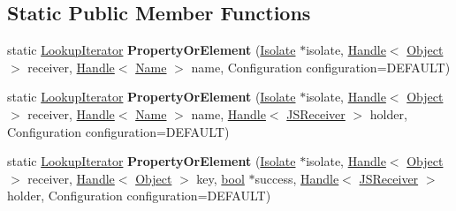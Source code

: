 \subsection*{Static Public Member Functions}
\begin{DoxyCompactItemize}
\item 
\mbox{\label{classv8_1_1internal_1_1LookupIterator_ada5b1e2e249036efcc799f937738c6c8}} 
static \mbox{\hyperlink{classv8_1_1internal_1_1LookupIterator}{Lookup\+Iterator}} {\bfseries Property\+Or\+Element} (\mbox{\hyperlink{classv8_1_1internal_1_1Isolate}{Isolate}} $\ast$isolate, \mbox{\hyperlink{classv8_1_1internal_1_1Handle}{Handle}}$<$ \mbox{\hyperlink{classv8_1_1internal_1_1Object}{Object}} $>$ receiver, \mbox{\hyperlink{classv8_1_1internal_1_1Handle}{Handle}}$<$ \mbox{\hyperlink{classv8_1_1internal_1_1Name}{Name}} $>$ name, Configuration configuration=D\+E\+F\+A\+U\+LT)
\item 
\mbox{\label{classv8_1_1internal_1_1LookupIterator_a0f4df452bbef58f2e4e00c300d6e0010}} 
static \mbox{\hyperlink{classv8_1_1internal_1_1LookupIterator}{Lookup\+Iterator}} {\bfseries Property\+Or\+Element} (\mbox{\hyperlink{classv8_1_1internal_1_1Isolate}{Isolate}} $\ast$isolate, \mbox{\hyperlink{classv8_1_1internal_1_1Handle}{Handle}}$<$ \mbox{\hyperlink{classv8_1_1internal_1_1Object}{Object}} $>$ receiver, \mbox{\hyperlink{classv8_1_1internal_1_1Handle}{Handle}}$<$ \mbox{\hyperlink{classv8_1_1internal_1_1Name}{Name}} $>$ name, \mbox{\hyperlink{classv8_1_1internal_1_1Handle}{Handle}}$<$ \mbox{\hyperlink{classv8_1_1internal_1_1JSReceiver}{J\+S\+Receiver}} $>$ holder, Configuration configuration=D\+E\+F\+A\+U\+LT)
\item 
\mbox{\label{classv8_1_1internal_1_1LookupIterator_a0fa46a19202428727d9f9daede9425e7}} 
static \mbox{\hyperlink{classv8_1_1internal_1_1LookupIterator}{Lookup\+Iterator}} {\bfseries Property\+Or\+Element} (\mbox{\hyperlink{classv8_1_1internal_1_1Isolate}{Isolate}} $\ast$isolate, \mbox{\hyperlink{classv8_1_1internal_1_1Handle}{Handle}}$<$ \mbox{\hyperlink{classv8_1_1internal_1_1Object}{Object}} $>$ receiver, \mbox{\hyperlink{classv8_1_1internal_1_1Handle}{Handle}}$<$ \mbox{\hyperlink{classv8_1_1internal_1_1Object}{Object}} $>$ key, \mbox{\hyperlink{classbool}{bool}} $\ast$success, \mbox{\hyperlink{classv8_1_1internal_1_1Handle}{Handle}}$<$ \mbox{\hyperlink{classv8_1_1internal_1_1JSReceiver}{J\+S\+Receiver}} $>$ holder, Configuration configuration=D\+E\+F\+A\+U\+LT)

\end{DoxyCompactItemize}
